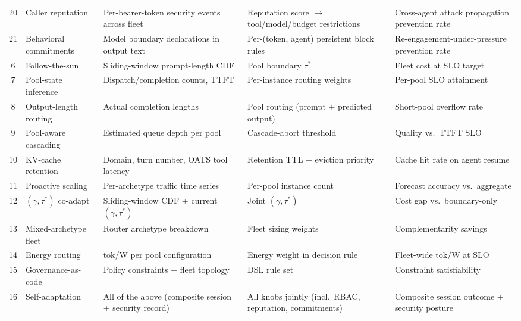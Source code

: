 \begin{opportunity}
\begin{table}[t]
\begin{tabularx}{\textwidth}{c l X X X}
\rowcolor{routergreen!6}
20 & Caller reputation
   & Per-bearer-token security events across fleet
   & Reputation score $\to$ tool/model/budget restrictions
   & Cross-agent attack propagation prevention rate \\
21 & Behavioral commitments
   & Model boundary declarations in output text
   & Per-(token, agent) persistent block rules
   & Re-engagement-under-pressure prevention rate \\
\midrule
\rowcolor{poolorange!6}
6  & Follow-the-sun
   & Sliding-window prompt-length CDF
   & Pool boundary $\tau^*$
   & Fleet cost at SLO target \\
7  & Pool-state inference
   & Dispatch/completion counts, TTFT
   & Per-instance routing weights
   & Per-pool SLO attainment \\
\rowcolor{poolorange!6}
8  & Output-length routing
   & Actual completion lengths
   & Pool routing (prompt $+$ predicted output)
   & Short-pool overflow rate \\
9  & Pool-aware cascading
   & Estimated queue depth per pool
   & Cascade-abort threshold
   & Quality vs.\ TTFT SLO \\
\rowcolor{poolorange!6}
10 & KV-cache retention
   & Domain, turn number, OATS tool latency
   & Retention TTL + eviction priority
   & Cache hit rate on agent resume \\
\midrule
11 & Proactive scaling
   & Per-archetype traffic time series
   & Per-pool instance count
   & Forecast accuracy vs.\ aggregate \\
\rowcolor{gray!6}
12 & $(\gamma, \tau^*)$ co-adapt
   & Sliding-window CDF + current $(\gamma, \tau^*)$
   & Joint $(\gamma, \tau^*)$
   & Cost gap vs.\ boundary-only \\
13 & Mixed-archetype fleet
   & Router archetype breakdown
   & Fleet sizing weights
   & Complementarity savings \\
\rowcolor{gray!6}
14 & Energy routing
   & tok/W per pool configuration
   & Energy weight in decision rule
   & Fleet-wide tok/W at SLO \\
15 & Governance-as-code
   & Policy constraints + fleet topology
   & DSL rule set
   & Constraint satisfiability \\
\rowcolor{gray!6}
16 & Self-adaptation
   & All of the above (composite session + security record)
   & All knobs jointly (incl.\ RBAC, reputation, commitments)
   & Composite session outcome + security posture \\
\bottomrule
\end{tabularx}
\end{table}


\end{opportunity}
